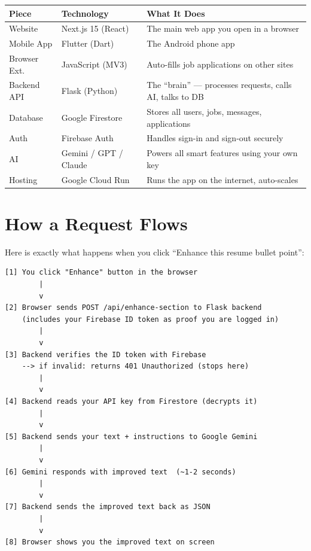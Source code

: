 \documentclass[12pt, a4paper]{report}
\begin{document}
\begin{center}
\begin{tabularx}{\textwidth}{llX}
\toprule
\textbf{Piece} & \textbf{Technology} & \textbf{What It Does} \\
\midrule
Website        & Next.js 15 (React)  & The main web app you open in a browser \\
Mobile App     & Flutter (Dart)      & The Android phone app \\
Browser Ext.   & JavaScript (MV3)    & Auto-fills job applications on other sites \\
Backend API    & Flask (Python)      & The ``brain'' --- processes requests, calls AI, talks to DB \\
Database       & Google Firestore    & Stores all users, jobs, messages, applications \\
Auth           & Firebase Auth       & Handles sign-in and sign-out securely \\
AI             & Gemini / GPT / Claude & Powers all smart features using your own key \\
Hosting        & Google Cloud Run    & Runs the app on the internet, auto-scales \\
\bottomrule
\end{tabularx}
\end{center}

\section{How a Request Flows}

Here is exactly what happens when you click ``Enhance this resume bullet point'':

\begin{lstlisting}[style=asciistyle, caption={Request flow for an AI feature}]
[1] You click "Enhance" button in the browser
        |
        v
[2] Browser sends POST /api/enhance-section to Flask backend
    (includes your Firebase ID token as proof you are logged in)
        |
        v
[3] Backend verifies the ID token with Firebase
    --> if invalid: returns 401 Unauthorized (stops here)
        |
        v
[4] Backend reads your API key from Firestore (decrypts it)
        |
        v
[5] Backend sends your text + instructions to Google Gemini
        |
        v
[6] Gemini responds with improved text  (~1-2 seconds)
        |
        v
[7] Backend sends the improved text back as JSON
        |
        v
[8] Browser shows you the improved text on screen
\end{lstlisting}
\end{document}
